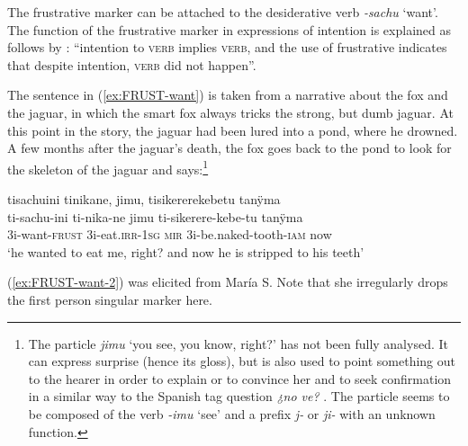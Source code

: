 

The frustrative marker can be attached to the desiderative verb \textit{-sachu} ‘want’. The function of the frustrative marker in expressions of intention is explained as follows by \citet[489]{Overall2017}: “intention to \textsc{verb} implies \textsc{verb}, and the use of frustrative indicates that despite intention, \textsc{verb} did not happen”.

The sentence in (\ref{ex:FRUST-want}) is taken from a narrative about the fox and the jaguar, in which the smart fox always tricks the strong, but dumb jaguar. At this point in the story, the jaguar had been lured into a pond, where he drowned. A few months after the jaguar's death, the fox goes back to the pond to look for the skeleton of the jaguar and says:\footnote{The  particle \textit{jimu} ‘you see, you know, right?’ has not been fully analysed. It can express surprise (hence its gloss), but is also used to point something out to the hearer in order to explain or to convince her and to seek confirmation in a similar way to the Spanish tag question \textit{¿no ve?} \citep[cf.][45]{Mendoza2015}. The  particle seems to be composed of the verb \textit{-imu} ‘see’ and a prefix \textit{j-} or \textit{ji-} with an unknown function.\label{fn:mirative}}

\ea\label{ex:FRUST-want}
\begingl 
\glpreamble tisachuini tinikane, jimu, tisikererekebetu tanÿma\\
\gla ti-sachu-ini ti-nika-ne jimu ti-sikerere-kebe-tu tanÿma\\ 
\glb 3i-want-\textsc{frust} 3i-eat.\textsc{irr}-1\textsc{sg} \textsc{mir} 3i-be.naked-tooth-\textsc{iam} now\\ 
\glft ‘he wanted to eat me, right? and now he is stripped to his teeth’
\trailingcitation{[jmx-n120429ls-x5.295]}
\xe

(\ref{ex:FRUST-want-2}) was elicited from María S. Note that she irregularly drops the first person singular marker here.

